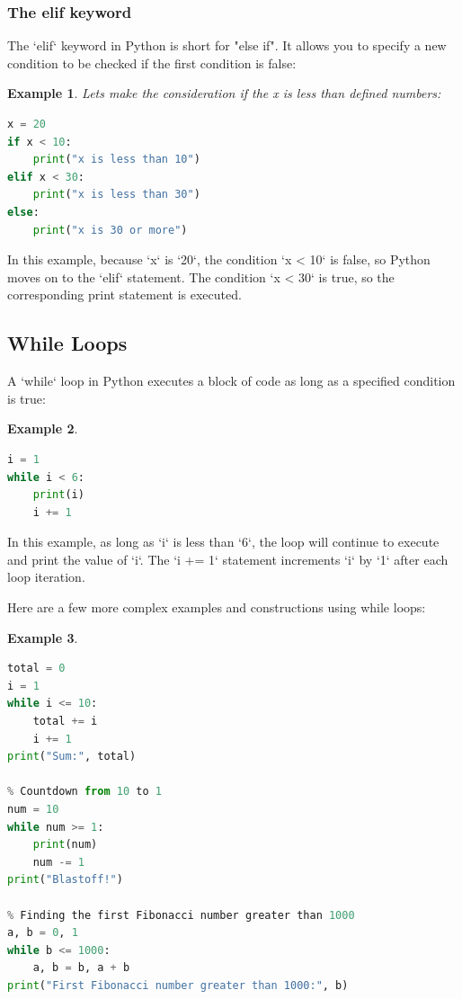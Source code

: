 \documentclass[12pt]{article}
\newtheorem{Example}{Example}[section]
\begin{document}
\subsubsection{The elif keyword}
The `elif` keyword in Python is short for "else if". It allows you to specify a new condition to be checked if the first condition is false:
\begin{Example}
Lets make the consideration if the x is less than defined numbers:
\begin{lstlisting}[language=Python]
x = 20
if x < 10:
    print("x is less than 10")
elif x < 30:
    print("x is less than 30")
else:
    print("x is 30 or more")
\end{lstlisting}
\end{Example}
In this example, because `x` is `20`, the condition `x < 10` is false, so Python moves on to the `elif` statement. The condition `x < 30` is true, so the corresponding print statement is executed.


\subsection{While Loops}

A `while` loop in Python executes a block of code as long as a specified condition is true:
\begin{Example}
\begin{lstlisting}[language=Python]
i = 1
while i < 6:
    print(i)
    i += 1
\end{lstlisting}
\end{Example}
In this example, as long as `i` is less than `6`, the loop will continue to execute and print the value of `i`. The `i += 1` statement increments `i` by `1` after each loop iteration.

Here are a few more complex examples and constructions using while loops:

\begin{Example}
\begin{lstlisting}[language=Python]
% Sum of numbers from 1 to 10
total = 0
i = 1
while i <= 10:
    total += i
    i += 1
print("Sum:", total)

% Countdown from 10 to 1
num = 10
while num >= 1:
    print(num)
    num -= 1
print("Blastoff!")

% Finding the first Fibonacci number greater than 1000
a, b = 0, 1
while b <= 1000:
    a, b = b, a + b
print("First Fibonacci number greater than 1000:", b)
\end{lstlisting}
\end{Example}
\end{document}
